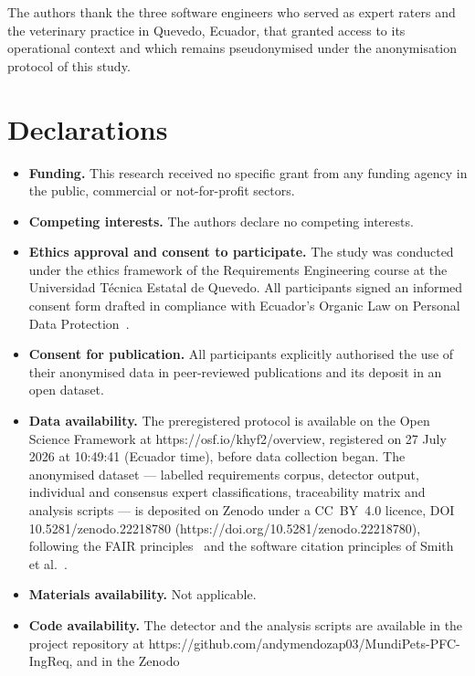 \documentclass[pdflatex,sn-mathphys-num]{sn-jnl}
\theoremstyle{thmstyleone}%
\theoremstyle{thmstyletwo}%
\theoremstyle{thmstylethree}%
\begin{document}
	
	The authors thank the three software engineers who served as expert raters and
	the veterinary practice in Quevedo, Ecuador, that granted access to its
	operational context and which remains pseudonymised under the anonymisation
	protocol of this study.
	
	\section*{Declarations}
	
	\begin{itemize}
		\item \textbf{Funding.} This research received no specific grant from any
		funding agency in the public, commercial or not-for-profit sectors.
		\item \textbf{Competing interests.} The authors declare no competing interests.
		\item \textbf{Ethics approval and consent to participate.} The study was
		conducted under the ethics framework of the Requirements Engineering course at
		the Universidad Técnica Estatal de Quevedo. All participants signed an informed
		consent form drafted in compliance with Ecuador's Organic Law on Personal Data
		Protection~\cite{lopdp2021}.
		\item \textbf{Consent for publication.} All participants explicitly authorised
		the use of their anonymised data in peer-reviewed publications and its deposit
		in an open dataset.
		\item \textbf{Data availability.} The preregistered protocol is available on the
		Open Science Framework at https://osf.io/khyf2/overview, registered on 27 July
		2026 at 10:49:41 (Ecuador time), before data collection began. The anonymised
		dataset --- labelled requirements corpus, detector output, individual and
		consensus expert classifications, traceability matrix and analysis scripts ---
		is deposited on Zenodo under a CC~BY~4.0 licence, DOI
		10.5281/zenodo.22218780 (https://doi.org/10.5281/zenodo.22218780), following
		the FAIR principles~\cite{wilkinson2016} and the software citation principles
		of Smith et al.~\cite{smith2016}.
		\item \textbf{Materials availability.} Not applicable.
		\item \textbf{Code availability.} The detector and the analysis scripts are
		available in the project repository at
		https://github.com/andymendozap03/MundiPets-PFC-IngReq, and in the Zenodo

\end{itemize}
\end{document}
